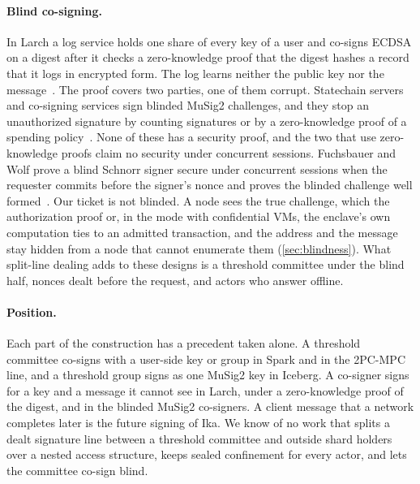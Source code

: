 \paragraph{Blind co-signing.} In Larch a log service holds one share of every key of a user and co-signs ECDSA on a digest after it checks a zero-knowledge proof that the digest hashes a record that it logs in encrypted form. The log learns neither the public key nor the message~\cite{Larch}. The proof covers two parties, one of them corrupt. Statechain servers and co-signing services sign blinded MuSig2 challenges, and they stop an unauthorized signature by counting signatures or by a zero-knowledge proof of a spending policy~\cite{MercuryLayer,BlindVault,Sigbash}. None of these has a security proof, and the two that use zero-knowledge proofs claim no security under concurrent sessions. Fuchsbauer and Wolf prove a blind Schnorr signer secure under concurrent sessions when the requester commits before the signer's nonce and proves the blinded challenge well formed~\cite{FW24}. Our ticket is not blinded. A node sees the true challenge, which the authorization proof or, in the mode with confidential VMs, the enclave's own computation ties to an admitted transaction, and the address and the message stay hidden from a node that cannot enumerate them (\cref{sec:blindness}). What split-line dealing adds to these designs is a threshold committee under the blind half, nonces dealt before the request, and actors who answer offline.

\paragraph{Position.} Each part of the construction has a precedent taken alone. A threshold committee co-signs with a user-side key or group in Spark and in the 2PC-MPC line, and a threshold group signs as one MuSig2 key in Iceberg. A co-signer signs for a key and a message it cannot see in Larch, under a zero-knowledge proof of the digest, and in the blinded MuSig2 co-signers. A client message that a network completes later is the future signing of Ika. We know of no work that splits a dealt signature line between a threshold committee and outside shard holders over a nested access structure, keeps sealed confinement for every actor, and lets the committee co-sign blind.
